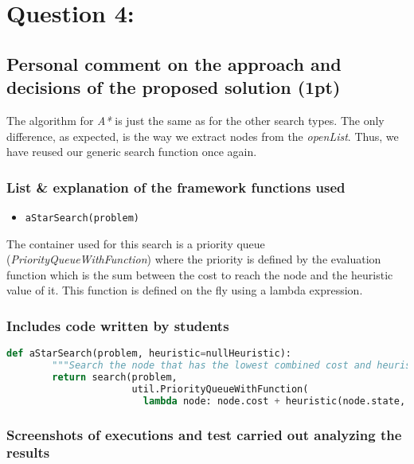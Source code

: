 \documentclass{article}
\begin{document}
\pagebreak
\section{Question 4: }

\subsection{Personal comment on the approach and decisions of the proposed solution (1pt)}

The algorithm for \textit{A*} is just the same as for the other search types. The only difference, as expected, is the way we extract nodes from the \emph{openList}. Thus, we have reused our generic search function once again.

\subsubsection{List \& explanation of the framework functions used}

\begin{itemize}
    \item \texttt{aStarSearch(problem)}
\end{itemize}

The container used for this search is a priority queue (\textit{PriorityQueueWithFunction}) where the priority is defined by the evaluation function which is the sum between the cost to reach the node and the heuristic value of it. This function is defined on the fly using a lambda expression.

\subsubsection{Includes code written by students}

\begin{lstlisting}[language=python,captionpos=t,caption={The \emph{A*} function (\emph{search.py})}]
    def aStarSearch(problem, heuristic=nullHeuristic):
        """Search the node that has the lowest combined cost and heuristic first."""
        return search(problem, 
                      util.PriorityQueueWithFunction(
                        lambda node: node.cost + heuristic(node.state, problem)))
\end{lstlisting}


\subsubsection{Screenshots of executions and test carried out analyzing the results}
\end{document}
